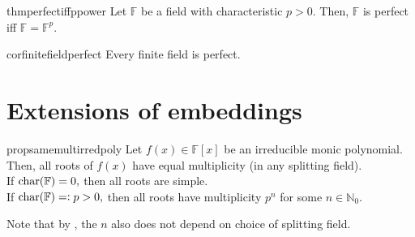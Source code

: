 \begin{restatable}[]{thm}{perfectiffppower}
\label{thm:perfectiffppower}
    Let $\mathbb{F}$ be a field with characteristic $p > 0.$ Then, $\mathbb{F}$ is perfect iff $\mathbb{F} = \mathbb{F}^p.$ \hfill\hyperref[thm:perfectiffppower2]{\downsym}
\end{restatable}

\begin{restatable}[]{cor}{finitefieldperfect}
\label{cor:finitefieldperfect}
    Every finite field is perfect. \hfill\hyperref[cor:finitefieldperfect2]{\downsym}
\end{restatable}

\section{Extensions of embeddings}
\begin{restatable}[]{prop}{samemultirredpoly}
\label{prop:samemultirredpoly}
    Let $f(x) \in \mathbb{F}[x]$ be an irreducible monic polynomial. Then, all roots of $f(x)$ have equal multiplicity (in any splitting field). \\
    If $\operatorname{char}(\mathbb{F}) = 0,$ then all roots are simple. \\
    If $\operatorname{char}(\mathbb{F}) =\vcentcolon p > 0,$ then all roots have multiplicity $p^n$ for some $n \in \mathbb{N}_0.$ \hfill\hyperref[prop:samemultirredpoly2]{\downsym}
\end{restatable}
Note that by , the $n$ also does not depend on choice of splitting field.

